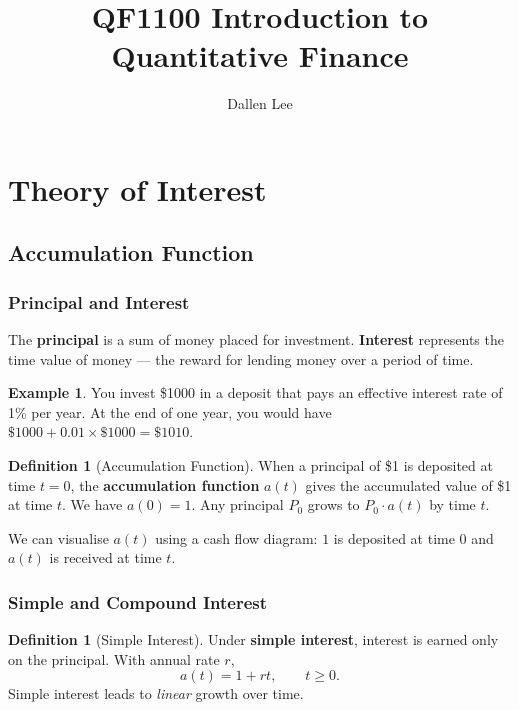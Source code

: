 \documentclass[12pt, a4paper]{article}
\title{\textbf{QF1100 Introduction to Quantitative Finance}} %
\author{Dallen Lee}
\theoremstyle{plain}
\theoremstyle{definition}
\newtheorem{definition}[theorem]{Definition}
\newtheorem{example}[theorem]{Example}
\theoremstyle{remark}
\newenvironment{sidenote}{%
  \par\vspace{0.5em}%
  \noindent\color{defcolor}%
}{%
  \par\vspace{0.5em}%
  \color{black}%
}
\begin{document}

\maketitle
\thispagestyle{empty}
\tableofcontents
\newpage


\section{Theory of Interest}

\subsection{Accumulation Function}

\subsubsection*{Principal and Interest}

The \textbf{principal} is a sum of money placed for investment. \textbf{Interest} represents the time value of money — the reward for lending money over a period of time.

\begin{example}
  You invest \$1000 in a deposit that pays an effective interest rate of 1\% per year. At the end of one year, you would have $\$1000 + 0.01 \times \$1000 = \$1010$.
\end{example}

\begin{definition}[Accumulation Function]
  When a principal of \$1 is deposited at time $t=0$, the \textbf{accumulation function} $a(t)$ gives the accumulated value of \$1 at time $t$. We have $a(0) = 1$. Any principal $P_0$ grows to $P_0 \cdot a(t)$ by time $t$.
\end{definition}

\begin{sidenote}
  We can visualise $a(t)$ using a cash flow diagram: $1$ is deposited at time $0$ and $a(t)$ is received at time $t$.
\end{sidenote}

\subsubsection{Simple and Compound Interest}

\begin{definition}[Simple Interest]
  Under \textbf{simple interest}, interest is earned only on the principal. With annual rate $r$,
  \[
    a(t) = 1 + rt, \qquad t \geq 0.
  \]
  Simple interest leads to \emph{linear} growth over time.
\end{definition}
\end{document}
